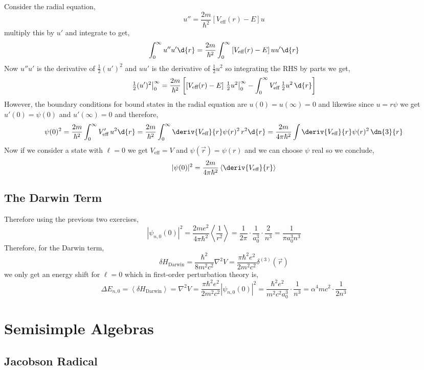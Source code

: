 \documentclass[12pt]{article}
\begin{document}
Consider the radial equation,
\[ u'' = \frac{2m}{\hbar^2} \left[ V_{\text{eff}}(r) - E \right] u \]
multiply this by $u'$ and integrate to get,
\[ \int_0^{\infty} u'' u' \d{r} = \frac{2m}{\hbar^2} \int_0^{\infty} \left[ V_{\text{eff}}(r) - E \right] u u' \d{r} \]
Now $u'' u'$ is the derivative of $\tfrac{1}{2} (u')^2$ and $u u'$ is the derivative of $\tfrac{1}{2} u^2$ so integrating the RHS by parts we get,
\[ \tfrac{1}{2} (u')^2 \big|_{0}^{\infty} = \frac{2 m}{\hbar^2} \left[ \left[ V_{\text{eff}}(r) - E \right] \, \tfrac{1}{2} u^2 \big|^{\infty}_0 - \int_0^{\infty} V_{\text{eff}}' \, \tfrac{1}{2} u^2 \, \d{r} \right] \]
However, the boundary conditions for bound states in the radial equation are $u(0) = u(\infty) = 0$ and likewise since $u = r \psi$ we get $u'(0) = \psi(0)$ and $u'(\infty) = 0$ and therefore,
\[ \psi(0)^2 = \frac{2m}{\hbar^2} \int_0^{\infty} V_{\text{eff}}' \, u^2 \d{r} = \frac{2 m}{\hbar^2} \int_0^{\infty} \deriv{V_{\text{eff}}}{r} \psi(r)^2 \, r^2 \d{r} = \frac{2m}{4 \pi \hbar^2} \int \deriv{V_{\text{eff}}}{r} \psi(r)^2 \,  \dn{3}{r} \]
Now if we consider a state with $\ell = 0$ we get $V_{\text{eff}} = V$ and $\psi(\vec{r}) = \psi(r)$ and we can choose $\psi$ real so we conclude,
\[ |\psi(0)|^2 = \frac{2 m}{4 \pi \hbar^2} \left<  \deriv{V_{\text{eff}}}{r} \right> \]

\subsection{The Darwin Term}

Therefore using the previous two exercises,
\[ |\psi_{n,0}(0)|^2 = \frac{2 m e^2}{4 \pi \hbar^2} \left< \frac{1}{r^2} \right> = \frac{1}{2 \pi} \cdot \frac{1}{a_0^3} \cdot \frac{2}{n^3} = \frac{1}{\pi a_0^3 n^3} \]
Therefore,  for the Darwin term,
\[ \delta H_{\text{Darwin}} = \frac{\hbar^2}{8 m^2 c^2} \nabla^2 V = \frac{\pi \hbar^2 e^2}{2 m^2 c^2} \delta^{(3)}(\vec{r}) \]
we only get an energy shift for $\ell = 0$ which in first-order perturbation theory is,
\[ \Delta E_{n,0} = \left< \delta H_{\text{Darwin}} \right> = \nabla^2 V = \frac{\pi \hbar^2 e^2}{2 m^2 c^2} | \psi_{n,0}(0) |^2 = \frac{\hbar^2 e^2}{m^2 c^2 a_0^3} \cdot \frac{1}{n^3} = \alpha^4 mc^2 \cdot \frac{1}{2 n^3} \]


\section{Semisimple Algebras}

\subsection{Jacobson Radical}
\end{document}

